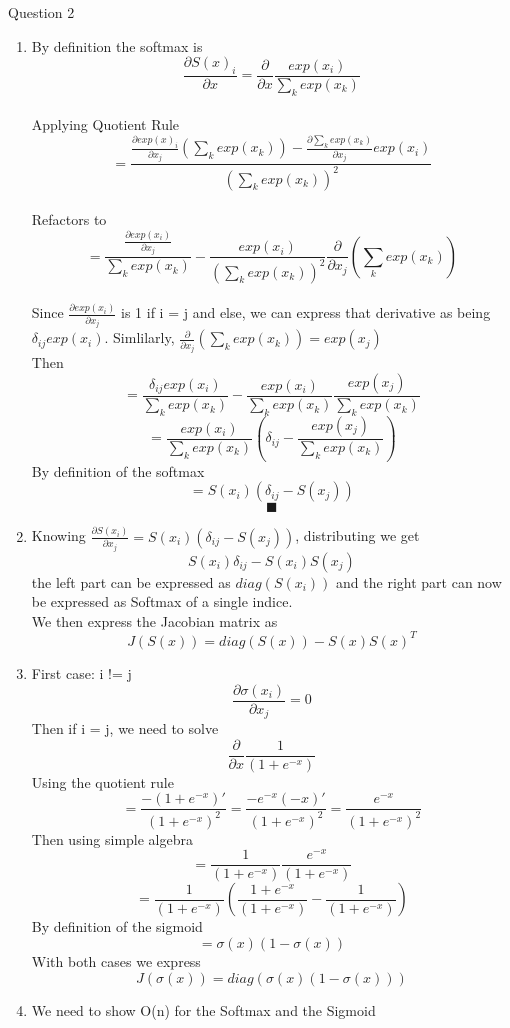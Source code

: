 \documentclass{article}
\begin{document}
 Question 2 \\
  \begin{enumerate}
  \item
	By definition the softmax is $$\frac{\partial S(x)_i}{\partial x} =  \frac{\partial }{\partial x} \frac{exp(x_i)}{\sum_k exp(x_k)}$$\\
	Applying Quotient Rule $$ = \frac{\frac{\partial exp(x)_i}{\partial x_j} (\sum_k exp(x_k)) -  \frac{\partial \sum_k exp(x_k)}{\partial x_j} exp(x_i)} {(\sum_k exp(x_k))^2} $$\\
	Refactors to $$= \frac{\frac{\partial exp(x_i)}{\partial x_j}}{\sum_k exp(x_k)} - \frac{exp(x_i)}{(\sum_k exp(x_k))^2} \frac{\partial }{\partial x_j} (\sum_k exp(x_k))$$\\
	Since $\frac{\partial exp(x_i)}{\partial x_j}$ is 1 if i = j and else, we can express that derivative as being $\delta_{ij}exp(x_i)$. Simlilarly,  $\frac{\partial }{\partial x_j} (\sum_k exp(x_k)) 		= exp(x_j) $\\
	Then $$ =\frac{\delta_{ij}exp(x_i)}{\sum_k exp(x_k)} - \frac{exp(x_i)}{\sum_k exp(x_k)} \frac{exp(x_j)}{\sum_k exp(x_k)} $$ $$=  \frac{exp(x_i)}{\sum_k exp(x_k)} (\delta_{ij} - 	        		           \frac{exp(x_j)}{\sum_k exp(x_k)}) $$
	By definition of the softmax $$ = S(x_i)(\delta_{ij} - S(x_j))$$
	$$\blacksquare$$

\item
	Knowing $\frac{\partial S(x_i)}{\partial x_j} = S(x_i)(\delta_{ij} - S(x_j))$, distributing we get $$ S(x_i)\delta_{ij} - S(x_i)S(x_j)$$ 
	the left part can be expressed as $diag(S(x_i))$ and the right part can now be expressed as Softmax of a single indice.\\
	We then express the Jacobian matrix as $$ J(S(x)) = diag(S(x)) - S(x)S(x)^T$$

\item
	First case: i != j   $$\frac{\partial \sigma(x_i)}{\partial x_j} = 0$$
	Then if i = j, we need to solve $$\frac{\partial }{\partial x}\frac{1}{(1 + e^{-x})}$$ Using the quotient rule $$ = \frac{- (1 + e^{-x})'}{(1 + e^{-x})^2} =
	\frac{- e^{-x}(-x)'}{(1 + e^{-x})^2} = \frac{e^{-x}}{(1 + e^{-x})^2} $$ Then using simple algebra $$ = \frac{1}{(1 + e^{-x})} \frac{e^{-x}}{(1 + e^{-x})}$$
	$$ = \frac{1}{(1 + e^{-x})} (\frac{1 + e^{-x} }{(1 + e^{-x})} - \frac{1}{(1 + e^{-x})})$$ By definition of the sigmoid $$ = \sigma(x)(1 - \sigma(x))$$
	With both cases we express $$J(\sigma(x)) = diag(\sigma(x)(1 - \sigma(x)))$$

\item 
	We need to show O(n) for the Softmax and the Sigmoid\\


\end{enumerate}
\end{document}
